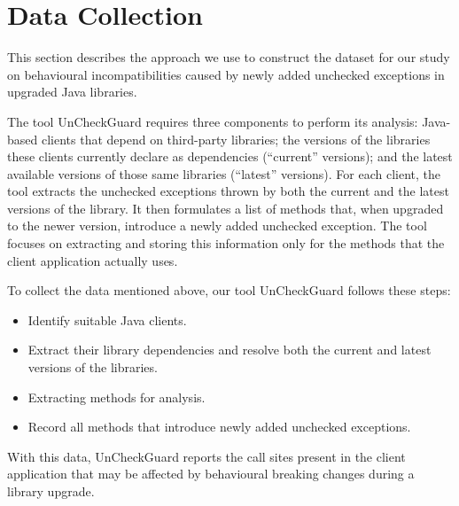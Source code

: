 \chapter{Data Collection}\label{data}

This section describes the approach we use to construct the dataset for our study on behavioural incompatibilities caused by newly added unchecked exceptions in upgraded Java libraries.


The tool UnCheckGuard requires three components to perform its analysis: Java-based clients that depend on third-party libraries; the versions of the libraries these clients currently declare as dependencies (“current” versions); and the latest available versions of those same libraries (“latest” versions). For each client, the tool extracts the unchecked exceptions thrown by both the current and the latest versions of the library. It then formulates a list of methods that, when upgraded to the newer version, introduce a newly added unchecked exception. The tool focuses on extracting and storing this information only for the methods that the client application actually uses.


To collect the data mentioned above, our tool UnCheckGuard follows these steps:
\begin{itemize}
    \item Identify suitable Java clients.
    \item Extract their library dependencies and resolve both the current and latest versions of the libraries.
    \item Extracting methods for analysis.
    \item Record all methods that introduce newly added unchecked exceptions.
\end{itemize}
With this data, UnCheckGuard reports the call sites present in the client application that may be affected by behavioural breaking changes during a library upgrade.

